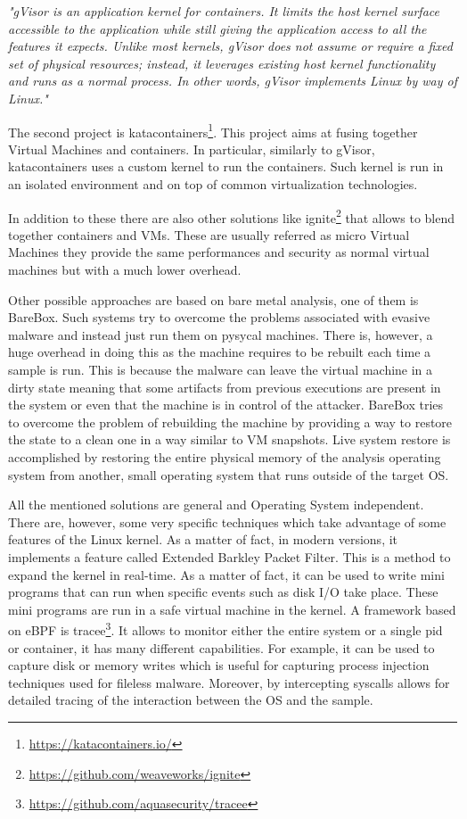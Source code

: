\textit{"gVisor is an application kernel for containers. It limits the host kernel surface accessible to the application while still giving the application access to all the features it expects. Unlike most kernels, gVisor does not assume or require a fixed set of physical resources; instead, it leverages existing host kernel functionality and runs as a normal process. In other words, gVisor implements Linux by way of Linux."}

The second project is katacontainers\footnote{\url{https://katacontainers.io/}}. This project aims at fusing together Virtual Machines and containers. In particular, similarly to gVisor, katacontainers uses a custom kernel to run the containers. Such kernel is run in an isolated environment and on top of common virtualization technologies. 

In addition to these there are also other solutions like ignite\footnote{\url{https://github.com/weaveworks/ignite}} that allows to blend together containers and VMs. These are usually referred as micro Virtual Machines they provide the same performances and security as normal virtual machines but with a much lower overhead. 

Other possible approaches are based on bare metal analysis, one of them is BareBox\cite{bbox}. Such systems try to overcome the problems associated with evasive malware and instead just run them on pysycal machines. There is, however, a huge overhead in doing this as the machine requires to be rebuilt each time a sample is run. This is because the malware can leave the virtual machine in a dirty state meaning that some artifacts from previous executions are present in the system or even that the machine is in control of the attacker. BareBox tries to overcome the problem of rebuilding the machine by providing a way to restore the state to a clean one in a way similar to VM snapshots. Live system restore is accomplished by restoring the entire physical memory of the analysis operating system from another, small operating system that runs outside of the target OS. 

\bigskip
All the mentioned solutions are general and Operating System independent. There are, however, some very specific techniques which take advantage of some features of the Linux kernel. As a matter of fact, in modern versions, it implements a feature called Extended Barkley Packet Filter. This is a method to expand the kernel in real-time. As a matter of fact, it can be used to write mini programs that can run when specific events such as disk I/O take place. These mini programs are run in a safe virtual machine in the kernel. A framework based on eBPF is tracee\footnote{\url{https://github.com/aquasecurity/tracee}}. It allows to monitor either the entire system or a single pid or container, it has many different capabilities. For example, it can be used to capture disk or memory writes which is useful for capturing process injection techniques used for fileless malware. Moreover, by intercepting syscalls allows for detailed tracing of the interaction between the OS and the sample. 

